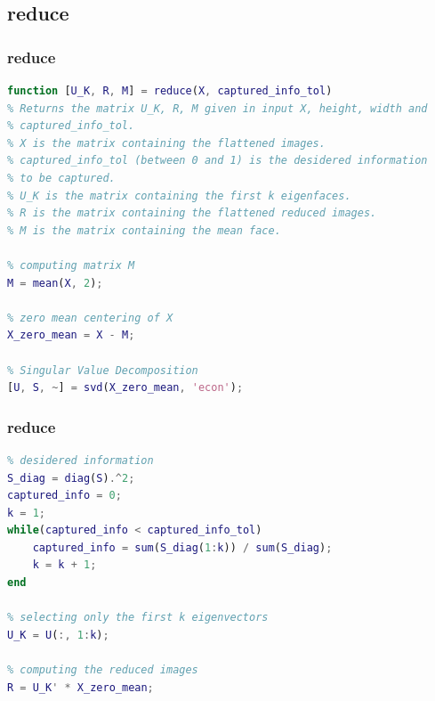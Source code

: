 \documentclass[10pt]{beamer}
\begin{document}
\subsection{reduce}
\begin{frame}[fragile]
    \frametitle{reduce}
   
    \begin{lstlisting}[language=Matlab, numbers=none]
function [U_K, R, M] = reduce(X, captured_info_tol)
% Returns the matrix U_K, R, M given in input X, height, width and
% captured_info_tol.
% X is the matrix containing the flattened images.
% captured_info_tol (between 0 and 1) is the desidered information
% to be captured.
% U_K is the matrix containing the first k eigenfaces.
% R is the matrix containing the flattened reduced images.
% M is the matrix containing the mean face.

% computing matrix M
M = mean(X, 2);

% zero mean centering of X
X_zero_mean = X - M;

% Singular Value Decomposition 
[U, S, ~] = svd(X_zero_mean, 'econ');
    \end{lstlisting}

\end{frame}

\begin{frame}[fragile]
    \frametitle{reduce}
   
    \begin{lstlisting}[language=Matlab, numbers=none]
% Selecting the number of eigenvectors to capture the 
% desidered information
S_diag = diag(S).^2;
captured_info = 0;
k = 1;
while(captured_info < captured_info_tol)
    captured_info = sum(S_diag(1:k)) / sum(S_diag);
    k = k + 1;
end

% selecting only the first k eigenvectors
U_K = U(:, 1:k);

% computing the reduced images
R = U_K' * X_zero_mean;  

    \end{lstlisting}

\end{frame}
\end{document}

